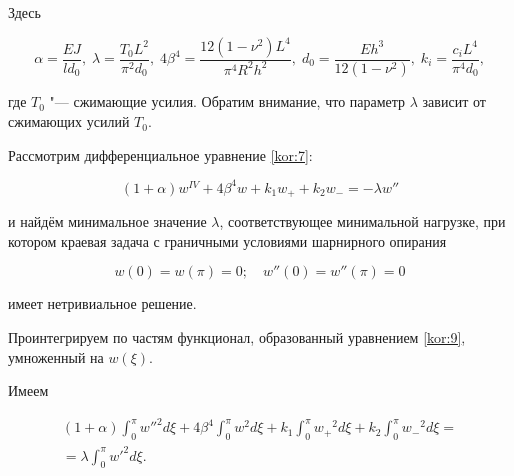 Здесь

\begin{equation}


\alpha=\frac{EJ}{ld_0}, \; \lambda=\frac{T_0 L^2}{\pi^2 d_0}, 

\;

4\beta^4=\frac{12(1-\nu^2)L^4}{\pi^4 R^2 h^2}, 

\;

d_0=\frac{E h^3}{12(1-\nu^2)}, 

\;

k_i=\frac{c_i L^4}{\pi^4d_0},


\label{kor:8}

\end{equation}

где $T_0$ "--- сжимающие усилия. Обратим внимание, что параметр $\lambda$ зависит от сжимающих усилий $T_0$.



\smallskip




Рассмотрим дифференциальное уравнение \eqref{kor:7}:

\begin{equation}

(1+\alpha)w^{IV}+4\beta^4 w+k_1 w_+ + k_2 w_- = -\lambda w'' 

\label{kor:9}

\end{equation}

и найдём минимальное значение $\lambda$, соответствующее минимальной нагрузке, при котором краевая задача с граничными условиями шарнирного опирания

$$ w(0)=w(\pi)=0; \quad w''(0)=w''(\pi)=0 $$

имеет нетривиальное решение.



Проинтегрируем по частям функционал, образованный уравнением \eqref{kor:9}, умноженный на $w(\xi)$. 

Имеем

\begin{multline}

 (1+\alpha) \int_0^\pi {w''}^2 d\xi + 4\beta^4 \int_0^\pi w^2 d\xi + k_1 \int_0^\pi {w_+}^2  d\xi + k_2 \int_0^\pi {w_-}^2  d\xi =

 \\

 =\lambda \int_0^\pi {w'}^{2} d\xi.

\label{kor:10}

\end{multline}

